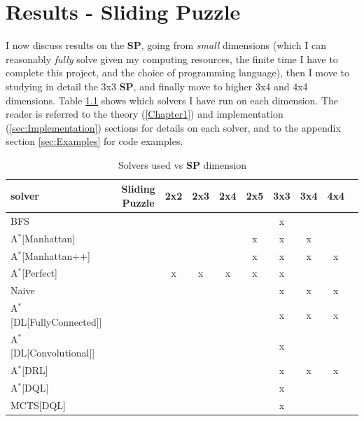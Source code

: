 \chapter{Results - Sliding Puzzle} %

\label{sec:ResultsSP} %


I now discuss results on the \textbf{SP}, going from \textit{small} dimensions (which I can reasonably \textit{fully} solve given my computing resources, the finite time I have to complete this project, and the choice of programming language), then I move to studying in detail the 3x3 \textbf{SP}, and finally move to higher 3x4 and 4x4 dimensions. Table \ref{tab:gridSP} shows which solvers I have run on each dimension. The reader is referred to the theory (\ref{Chapter1}) and implementation (\ref{sec:Implementation}) sections for details on each solver, and to the appendix section \ref{sec:Examples} for code examples.

\begin{table}[H]
\begin{center}
\begin{tabular}{l*{9}{c}r}
\hline
\textbf{solver}      & & \textbf{Sliding Puzzle} & \textbf{2x2} & \textbf{2x3} & \textbf{2x4} & \textbf{2x5}  & \textbf{3x3} & \textbf{3x4} & \textbf{4x4} \\ 
\hline
BFS   & & & & & & &  x  & & \\
\hline
A$^{*}$[Manhattan]   & & & & & &  x  &  x  &  x  & \\
\hline
A$^{*}$[Manhattan++]   & & & & & &  x  &  x  &  x  & x \\
\hline
A$^{*}$[Perfect]   & & &  x  &  x  &  x  &  x  &  x  & & \\
\hline
Naive   & & & & & & &  x  &  x  & x \\
\hline
A$^{*}$[DL[FullyConnected]]   & & & & & & &  x  &  x  & x \\
\hline
A$^{*}$[DL[Convolutional]]   & & & & & & &  x  &  & \\
\hline
A$^{*}$[DRL]   & & & & & & &  x  &  x  & x \\
\hline
A$^{*}$[DQL]   & & & & & & &  x  & & \\
\hline
MCTS[DQL]        & & & & & & &  x  & & \\
\end{tabular}
\caption{\label{tab:gridSP} Solvers used vs \textbf{SP} dimension}
\end{center}
\end{table}

